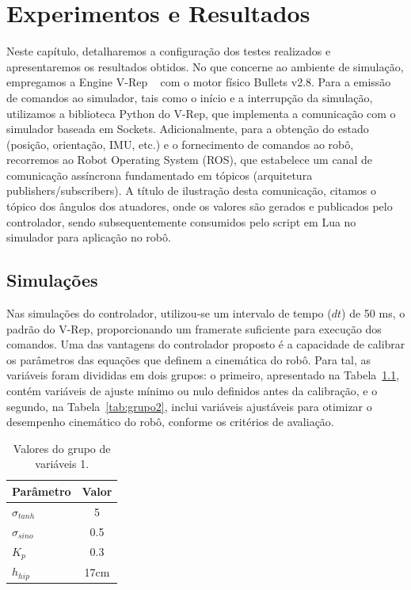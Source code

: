 \chapter{Experimentos e Resultados}
\label{cap:texto}

Neste capítulo, detalharemos a configuração dos testes realizados e apresentaremos os resultados obtidos. No que concerne ao ambiente de simulação, empregamos a Engine V-Rep ~\cite{Rohmer2013} com o motor físico Bullets v2.8. Para a emissão de comandos ao simulador, tais como o início e a interrupção da simulação, utilizamos a biblioteca Python do V-Rep, que implementa a comunicação com o simulador baseada em Sockets. Adicionalmente, para a obtenção do estado (posição, orientação, IMU, etc.) e o fornecimento de comandos ao robô, recorremos ao Robot Operating System (ROS), que estabelece um canal de comunicação assíncrona fundamentado em tópicos (arquitetura publishers/subscribers). A título de ilustração desta comunicação, citamos o tópico dos ângulos dos atuadores, onde os valores são gerados e publicados pelo controlador, sendo subsequentemente consumidos pelo script em Lua no simulador para aplicação no robô.

\section{Simulações}

Nas simulações do controlador, utilizou-se um intervalo de tempo ($dt$) de 50 ms, o padrão do V-Rep, proporcionando um framerate suficiente para execução dos comandos. Uma das vantagens do controlador proposto é a capacidade de calibrar os parâmetros das equações que definem a cinemática do robô. Para tal, as variáveis foram divididas em dois grupos: o primeiro, apresentado na Tabela~\ref{tab:grupo1}, contém variáveis de ajuste mínimo ou nulo definidos antes da calibração, e o segundo, na Tabela~\ref{tab:grupo2}, inclui variáveis ajustáveis para otimizar o desempenho cinemático do robô, conforme os critérios de avaliação.

\begin{table}[H]
\centering
\caption{Valores do grupo de variáveis 1.}
\label{tab:grupo1}
\begin{tabular}{lc}
\hline
Parâmetro & Valor \\
\hline
$\sigma_{tanh}$ & 5 \\
$\sigma_{sino}$ & 0.5 \\
$K_p$ & 0.3 \\
$h_{hip}$ & 17cm \\
\hline
\end{tabular}
\end{table}

